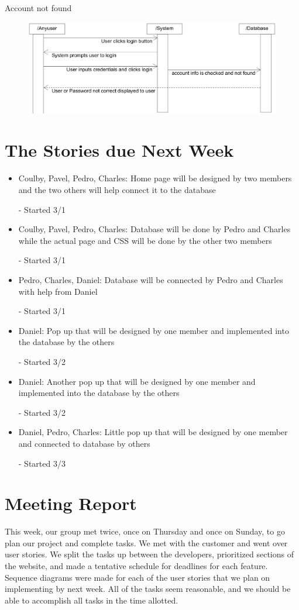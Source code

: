 \documentclass[12pt]{article}
\begin{document}
Account not found
\begin{figure}[h!]
\includegraphics[width=\textwidth]{accountnotfound}
\end{figure}
\section{The Stories due Next Week}
\begin{itemize}
\item
	Coulby, Pavel, Pedro, Charles: Home page will be designed by two members and the
	two others will help connect it to the database

	- Started 3/1
\item
	Coulby, Pavel, Pedro, Charles: Database will be done by Pedro and Charles while
	the actual page and CSS will be done by the other two members

	- Started 3/1
\item
	Pedro, Charles, Daniel: Database will be connected by Pedro and Charles with help
	from Daniel

	- Started 3/1
\item
	Daniel: Pop up that will be designed by one member and implemented into the
	database by the others

	- Started 3/2
\item
	Daniel: Another pop up that will be designed by one member and implemented into
	the database by the others

	- Started 3/2
\item
	Daniel, Pedro, Charles: Little pop up that will be designed by one member and
	connected to database by others

	- Started 3/3
\end{itemize}
\section{Meeting Report}
This week, our group met twice, once on Thursday and once on Sunday, to go plan our
project and complete tasks. We met with the customer and went over user stories. We split
the tasks up between the developers, prioritized sections of the website, and made a
tentative schedule for deadlines for each feature. Sequence diagrams were made for each of
the user stories that we plan on implementing by next week. All of the tasks seem
reasonable, and we should be able to accomplish all tasks in the time allotted.
\end{document}
